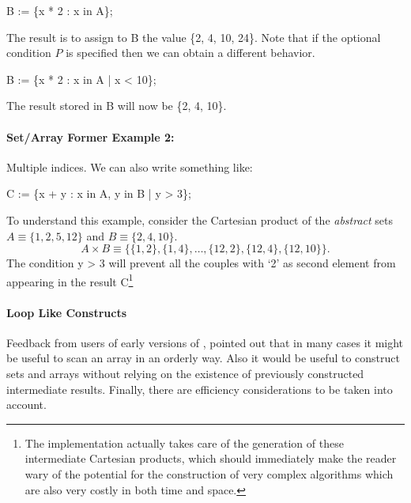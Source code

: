 \vspace{2mm}

{\tok B := \{x * 2 : x in A\};}

\vspace{2mm}

\noindent
The result is to assign to {\tok B} the value {\tok \{2, 4, 10, 24\}}.
Note that if the optional condition $P$ is specified then we can
obtain a different behavior.

\vspace{2mm}

{\tok B := \{x * 2 : x in A | x < 10\};}

\vspace{2mm}

\noindent
The result stored in {\tok B} will now be {\tok \{2, 4, 10\}}.

\paragraph{Set/Array Former Example 2:} Multiple indices.  We can also write
something like:

\vspace{2mm}

{\tok C := \{x + y : x in A, y in B | y > 3\};}

\vspace{2mm}

\noindent
To understand this example, consider the Cartesian product of the {\em
abstract\/} sets $A \equiv \{1, 2, 5, 12\}$ and $B \equiv \{2, 4, 10\}$.
\[
	A \times B
	\equiv \{\{1, 2\}, \{1, 4\}, \ldots, \{12, 2\}, \{12, 4\}, \{12, 10\}\}.
\]
The condition {\tok y > 3} will prevent all the couples with `2' as
second element from appearing in the result {\tok C}\footnote{The
implementation actually takes care of the generation of these
intermediate Cartesian products, which should immediately make the
reader wary of the potential for the construction of very complex
algorithms which are also very costly in both time and space.}


\paragraph{Loop Like Constructs} Feedback from users of early versions
of \Shift, pointed out that in many cases it might be useful to
scan an array in an orderly way.  Also it would be useful to construct
sets and arrays without relying on the existence of previously
constructed intermediate results.  Finally, there are efficiency
considerations to be taken into account.

